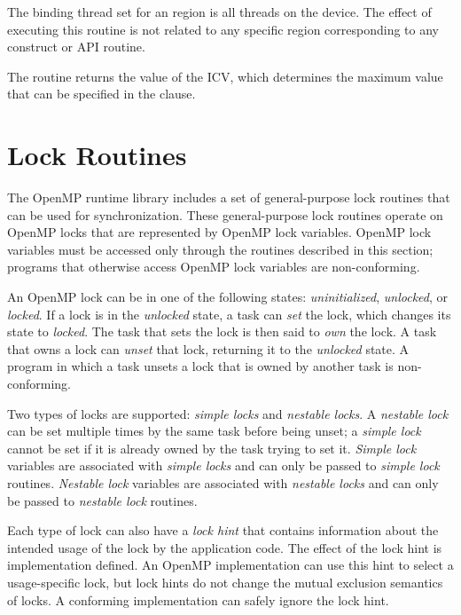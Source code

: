 \binding

The binding thread set for an  region is all threads
on the device. The effect of executing this routine is not related to any specific region
corresponding to any construct or API routine.

\effect

The  routine returns the value of the 
ICV, which determines the maximum value that can be specified in the  clause.










\newpage
\section{Lock Routines}
\label{sec:Lock Routines}
The OpenMP runtime library includes a set of general-purpose lock routines that can be 
used for synchronization. These general-purpose lock routines operate on OpenMP locks 
that are represented by OpenMP lock variables. OpenMP lock variables must be 
accessed only through the routines described in this section; programs that otherwise 
access OpenMP lock variables are non-conforming.

An OpenMP lock can be in one of the following states: \emph{uninitialized}, \emph{unlocked}, or 
\emph{locked}. If a lock is in the \emph{unlocked} state, a task can \emph{set} the lock, which changes its state 
to \emph{locked}. The task that sets the lock is then said to \emph{own} the lock. A task that owns a 
lock can \emph{unset} that lock, returning it to the \emph{unlocked} state. A program in which a task 
unsets a lock that is owned by another task is non-conforming.

Two types of locks are supported: \emph{simple locks} and \emph{nestable locks}. A \emph{nestable lock} can 
be set multiple times by the same task before being unset; a \emph{simple lock} cannot be set if 
it is already owned by the task trying to set it. \emph{Simple lock} variables are associated with 
\emph{simple locks} and can only be passed to \emph{simple lock} routines. \emph{Nestable lock} variables are 
associated with \emph{nestable locks} and can only be passed to \emph{nestable lock} routines.

Each type of lock can also have a \emph{lock hint} that contains information about the intended usage 
of the lock by the application code.  The effect of the lock hint is
implementation defined.  An OpenMP implementation can use this hint to select a
usage-specific lock, but lock hints do not change the mutual exclusion semantics of locks. 
A conforming implementation can safely ignore the lock hint.

